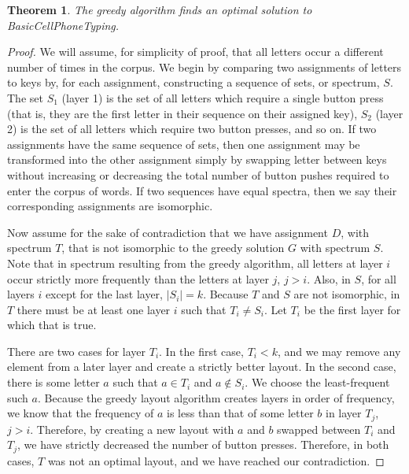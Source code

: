 \documentclass{article}
\newtheorem{theorem}{Theorem}
\begin{document}
\begin{theorem}
The greedy algorithm finds an optimal solution to {\sc BasicCellPhoneTyping}.
\label{basicthm}
\end{theorem}
\begin{proof}
We will assume, for simplicity of proof, that all letters occur a different number of times in the corpus.  
We begin by comparing two assignments of letters to keys by, for each assignment,
constructing a sequence of sets, or spectrum, $S$.  The set $S_1$ (layer 1) is the set of all
letters which require a single button press (that is, they are the first
letter in their sequence on their assigned key), $S_2$ (layer 2) is the set of
all letters which require two button presses, and so on.  If two assignments
have the same sequence of sets, then one assignment may be transformed into
the other assignment simply by swapping letter between keys without
increasing or decreasing the total number of button pushes required to enter
the corpus of words.  If two sequences have equal spectra, then we say their corresponding assignments are isomorphic.

Now assume for the sake of contradiction that we have assignment $D$, with spectrum $T$, that is not isomorphic to the greedy solution $G$ with spectrum $S$.
Note that in spectrum resulting from the greedy algorithm, all letters at layer
$i$ occur strictly more frequently than the letters at layer $j$, $j > i$.
Also, in $S$, for all layers $i$ except for the last layer, $|S_i| = k$.
Because $T$ and $S$ are not isomorphic, in $T$ there must be at least one layer $i$ such that $T_i \neq S_i$.  Let $T_i$ be the first layer for which that is true.

There are two cases for layer $T_i$.  In the first case, $T_i < k$, and we may
remove any element from a later layer and create a strictly better layout.  In
the second case, there is some letter $a$ such that $a \in T_i$ and $a \not\in
S_i$.  We choose the least-frequent such $a$.  Because the greedy layout
algorithm creates layers in order of frequency, we know that the frequency of
$a$ is less than that of some letter $b$ in layer $T_j$, $j>i$.  Therefore, by
creating a new layout with $a$ and $b$ swapped between $T_i$ and $T_j$, we have
strictly decreased the number of button presses.  Therefore, in both cases,
$T$ was not an optimal layout, and we have reached our contradiction.
\end{proof}
\end{document}
